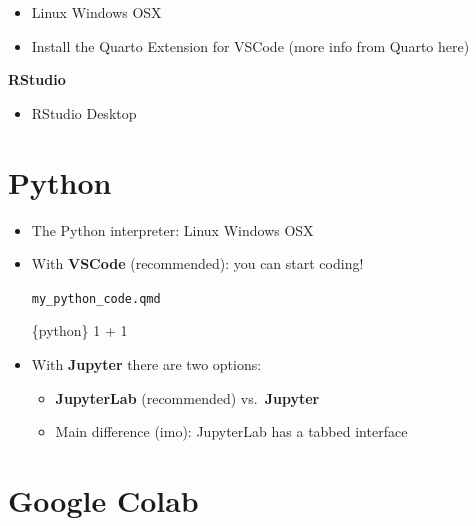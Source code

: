 \documentclass[
  letterpaper,
  DIV=11,
  numbers=noendperiod,
  oneside]{scrreprt}
\newenvironment{Shaded}{\begin{snugshade}}{\end{snugshade}}
\newcommand{\DecValTok}[1]{\textcolor[rgb]{0.68,0.00,0.00}{#1}}
\newcommand{\InformationTok}[1]{\textcolor[rgb]{0.37,0.37,0.37}{#1}}
\newcommand{\OperatorTok}[1]{\textcolor[rgb]{0.37,0.37,0.37}{#1}}
\providecommand{\tightlist}{%
  \setlength{\itemsep}{0pt}\setlength{\parskip}{0pt}}\usepackage{longtable,booktabs,array}
\begin{document}
\begin{itemize}
\item
  Linux \textbar{} Windows \textbar{} OSX
\item
  Install the Quarto Extension for VSCode (more info from Quarto here)
\end{itemize}

\textbf{RStudio}

\begin{itemize}
\tightlist
\item
  RStudio Desktop
\end{itemize}

\hypertarget{python}{%
\section{Python}\label{python}}

\begin{itemize}
\item
  The Python interpreter: Linux \textbar{} Windows \textbar{} OSX
\item
  With \textbf{VSCode} (recommended): you can start coding!

  \begin{codelisting}

  \caption{\texttt{my_python_code.qmd}}

\begin{Shaded}
\begin{Highlighting}[]
\InformationTok{\textasciigrave{}\textasciigrave{}\textasciigrave{}\{python\}}
\DecValTok{1} \OperatorTok{+} \DecValTok{1}
\InformationTok{\textasciigrave{}\textasciigrave{}\textasciigrave{}}
\end{Highlighting}
\end{Shaded}

  \end{codelisting}
\item
  With \textbf{Jupyter} there are two options:

  \begin{itemize}
  \tightlist
  \item
    \textbf{JupyterLab} (recommended) vs.~\textbf{Jupyter}
  \item
    Main difference (imo): JupyterLab has a tabbed interface
  \end{itemize}
\end{itemize}

\hypertarget{google-colab}{%
\section{Google Colab}\label{google-colab}}
\end{document}
